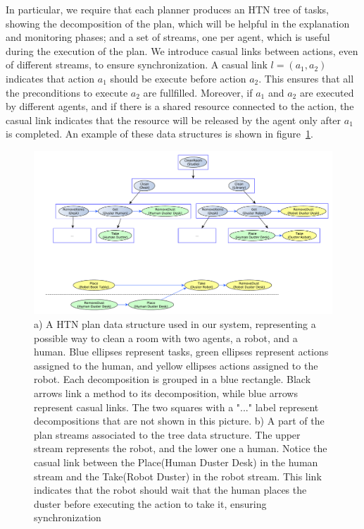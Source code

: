 In particular, we require that each planner produces an HTN tree of tasks, showing the decomposition of the plan, which will be helpful in the explanation and monitoring phases; and a set of streams, one per agent, which is useful during the execution of the plan. We introduce casual links between actions, even of different streams, to ensure synchronization. A casual link $l=(a_1,a_2)$ indicates that action $a_1$ should be execute before action $a_2$. This ensures that all the preconditions to execute $a_2$ are fullfilled. Moreover, if $a_1$ and $a_2$ are executed by different agents, and if there is a shared resource connected to the action, the casual link indicates that the resource will be released by the agent only after $a_1$ is completed. An example of these data structures is shown in figure~\ref{fig:plan_management-plan_structure}.

\begin{figure}[ht!]
 \centering
  \includegraphics[scale=0.45]{img/plan_management/plan_data_example.pdf}
 \caption[Plan data structures]{a) A HTN plan data structure used in our system, representing a possible way to clean a room
 with two agents, a robot, and a human. Blue ellipses represent tasks, green ellipses represent
 actions assigned to the human, and yellow ellipses actions assigned to the robot. Each decomposition is grouped
 in a blue rectangle. Black arrows link a method to its decomposition, while blue arrows represent casual links. The two squares with a "..." label represent decompositions that are not shown in this picture.
 b) A part of the plan streams associated to the tree data structure. The upper stream represents the robot, and the lower one a human. Notice the casual link between the Place(Human Duster Desk) in the human stream and the Take(Robot Duster) in the robot stream. This link indicates that the robot should wait that the human places the duster before executing the action to take it, ensuring synchronization }
 \label{fig:plan_management-plan_structure}
 \end{figure}


